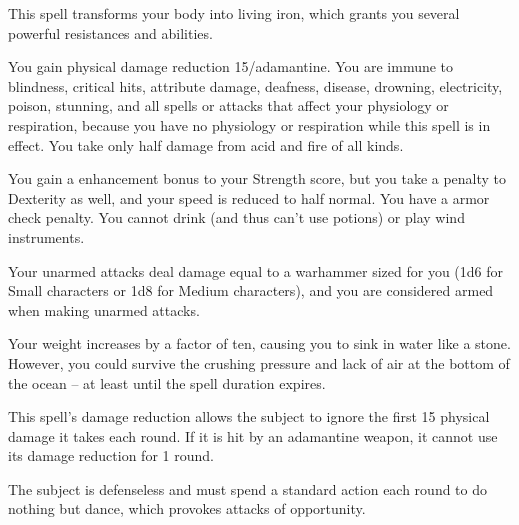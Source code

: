\spelldur{\durshort \dismissable}
\begin{spelleffect}
    This spell transforms your body into living iron, which grants you several powerful resistances and abilities.
    \par You gain physical damage reduction 15/adamantine. You are immune to blindness, critical hits, attribute damage, deafness, disease, drowning, electricity, poison, stunning, and all spells or attacks that affect your physiology or respiration, because you have no physiology or respiration while this spell is in effect. You take only half damage from acid and fire of all kinds.
    \par You gain a  enhancement bonus to your Strength score, but you take a  penalty to Dexterity as well, and your speed is reduced to half normal. You have a  armor check penalty. You cannot drink (and thus can't use potions) or play wind instruments.
    \par Your unarmed attacks deal damage equal to a warhammer sized for you (1d6 for Small characters or 1d8 for Medium characters), and you are considered armed when making unarmed attacks.
    \par Your weight increases by a factor of ten, causing you to sink in water like a stone. However, you could survive the crushing pressure and lack of air at the bottom of the ocean -- at least until the spell duration expires.
\end{spelleffect}
\begin{spellnotes}
    This spell's damage reduction allows the subject to ignore the first 15 physical damage it takes each round. If it is hit by an adamantine weapon, it cannot use its damage reduction for 1 round.
\end{spellnotes}

\begin{spelleffect}
    The subject is defenseless and must spend a standard action each round to do nothing but dance, which provokes attacks of opportunity.
\end{spelleffect}

